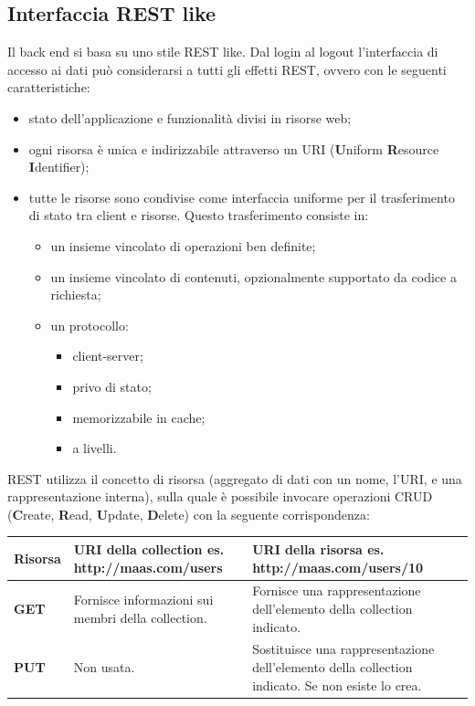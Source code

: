 \begin{itemize}
\subsection{Interfaccia REST like}
Il back end si basa su uno stile REST like. Dal login al logout l'interfaccia di accesso ai dati può considerarsi a tutti gli effetti REST, ovvero con le seguenti caratteristiche:
\begin{itemize}
\item stato dell'applicazione e funzionalità divisi in risorse web;
\item ogni risorsa è unica e indirizzabile attraverso un URI (\textbf{U}niform \textbf{R}esource \textbf{I}dentifier);
\item tutte le risorse sono condivise come interfaccia uniforme per il trasferimento di stato tra client e risorse. Questo trasferimento consiste in:
\begin{itemize}
\item un insieme vincolato di operazioni ben definite;
\item un insieme vincolato di contenuti, opzionalmente supportato da codice a richiesta;
\item un protocollo:
\begin{itemize}
\item client-server;
\item privo di stato;
\item memorizzabile in cache;
\item a livelli.
\end{itemize}
\end{itemize}
\end{itemize}
REST utilizza il concetto di risorsa (aggregato di dati con un nome, l'URI, e una rappresentazione interna), sulla quale è possibile invocare operazioni CRUD (\textbf{C}reate, \textbf{R}ead, \textbf{U}pdate, \textbf{D}elete) con la seguente corrispondenza:
\begin{table}[H]
\centering
\label{CRUD}
\begin{tabular}{| >{\centering}p{3cm} | >{\centering}p{5cm} | >{\centering}p{6cm} |}
\hline
\textbf{Risorsa} & \textbf{URI della collection} \newline es. http://maas.com/users & \textbf{URI della risorsa} \newline es. http://maas.com/users/10 \tabularnewline \hline
\textbf{GET} & Fornisce informazioni sui membri della collection. & Fornisce una rappresentazione dell'elemento della collection indicato. \tabularnewline \hline
\textbf{PUT} & Non usata. & Sostituisce una rappresentazione dell'elemento della collection indicato. Se non esiste lo crea.  \tabularnewline \hline

\end{tabular}
\end{table}
\end{itemize}
